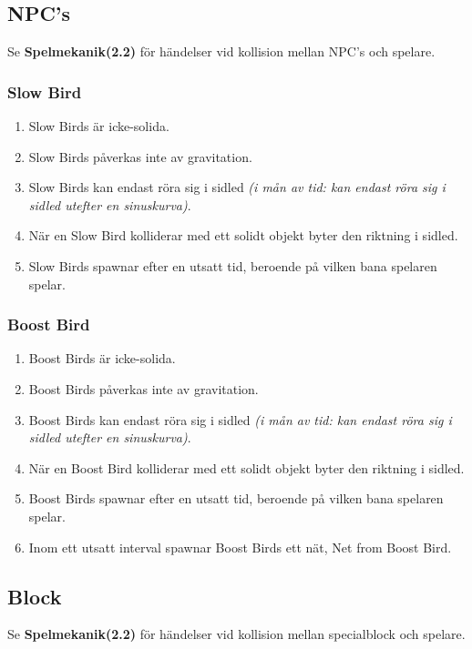 \documentclass{TDP003mall}
\begin{document}
\newpage

\subsection{NPC's}
Se \textbf{Spelmekanik(2.2)} för händelser vid kollision mellan NPC's och spelare.

\subsubsection{Slow Bird}
\begin{enumerate}
\item Slow Birds är icke-solida.
\item Slow Birds påverkas inte av gravitation.
\item Slow Birds kan endast röra sig i sidled \textit{(i mån av tid: kan endast röra sig i sidled utefter en sinuskurva)}.
\item När en Slow Bird kolliderar med ett solidt objekt byter den riktning i sidled.
\item Slow Birds spawnar efter en utsatt tid, beroende på vilken bana spelaren spelar.
\end{enumerate}

\subsubsection{Boost Bird}
\begin{enumerate}
\item Boost Birds är icke-solida.
\item Boost Birds påverkas inte av gravitation.
\item Boost Birds kan endast röra sig i sidled \textit{(i mån av tid: kan endast röra sig i sidled utefter en sinuskurva)}.
\item När en Boost Bird kolliderar med ett solidt objekt byter den riktning i sidled.
\item Boost Birds spawnar efter en utsatt tid, beroende på vilken bana spelaren spelar.
\item Inom ett utsatt interval spawnar Boost Birds ett nät, Net from Boost Bird.
\end{enumerate}

\subsection{Block}
Se \textbf{Spelmekanik(2.2)} för händelser vid kollision mellan specialblock och spelare.
\end{document}
